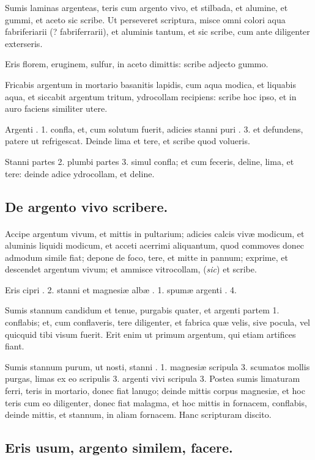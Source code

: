 \documentclass[a4paper, 11pt, oneside, polutonikogreek, italian]{article}
\begin{document}
Sumis laminas argenteas, teris cum argento vivo, et stilbada, et alumine, et gummi, et aceto sic scribe. Ut perseveret scriptura, misce omni colori aqua fabriferiarii (? fabriferrarii), et aluminis tantum, et sic scribe, cum ante diligenter exterseris.

Eris florem, eruginem, sulfur, in aceto dimittis: scribe adjecto gummo.

Fricabis argentum in mortario basanitis lapidis, cum aqua modica, et liquabis aqua, et siccabit argentum tritum, ydrocollam recipiens: scribe hoc ipso, et in auro faciens similiter utere.

Argenti \roundz. 1. confla, et, cum solutum fuerit, adicies stanni puri \roundz. 3. et defundens, patere ut refrigescat. Deinde lima et tere, et scribe quod volueris.

Stanni partes 2. plumbi partes 3. simul confla; et cum feceris, deline, lima, et tere: deinde adice ydrocollam, et deline.

\subsection{De argento vivo scribere.}
\paragraph{}
Accipe argentum vivum, et mittis in pultarium; adicies calcis vivæ modicum, et aluminis liquidi modicum, et acceti acerrimi aliquantum, quod commoves donec admodum simile fiat; depone de foco, tere, et mitte in pannum; exprime, et descendet argentum vivum; et ammisce vitrocollam, (\emph{sic}) et scribe.

Eris cipri \roundz. 2. stanni et magnesiæ albæ \roundz. 1. spumæ argenti \roundz. 4.

Sumis stannum candidum et tenue, purgabis quater, et argenti partem 1. conflabis; et, cum conflaveris, tere diligenter, et fabrica quæ velis, sive pocula, vel quicquid tibi visum fuerit. Erit enim ut primum argentum, qui etiam artifices fiant.

Sumis stannum purum, ut nosti, stanni \roundz. 1. magnesiæ scripula 3. scumatos mollis purgas, limas ex eo scripulis 3. argenti vivi scripula 3. Postea sumis limaturam ferri, teris in mortario, donec fiat lanugo; deinde mittis corpus magnesiæ, et hoc teris cum eo diligenter, donec fiat malagma, et hoc mittis in fornacem, conflabis, deinde mittis, et stannum, in aliam fornacem. Hanc scripturam discito.

\subsection{Eris usum, argento similem, facere.}
\end{document}
